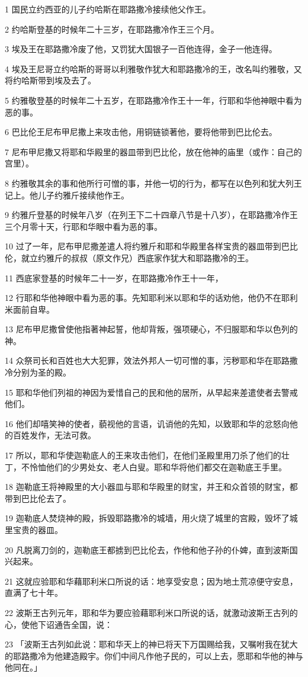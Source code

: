 \par 1 国民立约西亚的儿子约哈斯在耶路撒冷接续他父作王。
\par 2 约哈斯登基的时候年二十三岁，在耶路撒冷作王三个月。
\par 3 埃及王在耶路撒冷废了他，又罚犹大国银子一百他连得，金子一他连得。
\par 4 埃及王尼哥立约哈斯的哥哥以利雅敬作犹大和耶路撒冷的王，改名叫约雅敬，又将约哈斯带到埃及去了。
\par 5 约雅敬登基的时候年二十五岁，在耶路撒冷作王十一年，行耶和华他神眼中看为恶的事。
\par 6 巴比伦王尼布甲尼撒上来攻击他，用铜链锁著他，要将他带到巴比伦去。
\par 7 尼布甲尼撒又将耶和华殿里的器皿带到巴比伦，放在他神的庙里（或作：自己的宫里）。
\par 8 约雅敬其余的事和他所行可憎的事，并他一切的行为，都写在以色列和犹大列王记上。他儿子约雅斤接续他作王。
\par 9 约雅斤登基的时候年八岁（在列王下二十四章八节是十八岁），在耶路撒冷作王三个月零十天，行耶和华眼中看为恶的事。
\par 10 过了一年，尼布甲尼撒差遣人将约雅斤和耶和华殿里各样宝贵的器皿带到巴比伦，就立约雅斤的叔叔（原文作兄）西底家作犹大和耶路撒冷的王。
\par 11 西底家登基的时候年二十一岁，在耶路撒冷作王十一年，
\par 12 行耶和华他神眼中看为恶的事。先知耶利米以耶和华的话劝他，他仍不在耶利米面前自卑。
\par 13 尼布甲尼撒曾使他指著神起誓，他却背叛，强项硬心，不归服耶和华以色列的神。
\par 14 众祭司长和百姓也大大犯罪，效法外邦人一切可憎的事，污秽耶和华在耶路撒冷分别为圣的殿。
\par 15 耶和华他们列祖的神因为爱惜自己的民和他的居所，从早起来差遣使者去警戒他们。
\par 16 他们却嘻笑神的使者，藐视他的言语，讥诮他的先知，以致耶和华的忿怒向他的百姓发作，无法可救。
\par 17 所以，耶和华使迦勒底人的王来攻击他们，在他们圣殿里用刀杀了他们的壮丁，不怜恤他们的少男处女、老人白叟。耶和华将他们都交在迦勒底王手里。
\par 18 迦勒底王将神殿里的大小器皿与耶和华殿里的财宝，并王和众首领的财宝，都带到巴比伦去了。
\par 19 迦勒底人焚烧神的殿，拆毁耶路撒冷的城墙，用火烧了城里的宫殿，毁坏了城里宝贵的器皿。
\par 20 凡脱离刀剑的，迦勒底王都掳到巴比伦去，作他和他子孙的仆婢，直到波斯国兴起来。
\par 21 这就应验耶和华藉耶利米口所说的话：地享受安息；因为地土荒凉便守安息，直满了七十年。
\par 22 波斯王古列元年，耶和华为要应验藉耶利米口所说的话，就激动波斯王古列的心，使他下诏通告全国，说：
\par 23 「波斯王古列如此说：耶和华天上的神已将天下万国赐给我，又嘱咐我在犹大的耶路撒冷为他建造殿宇。你们中间凡作他子民的，可以上去，愿耶和华他的神与他同在。」


